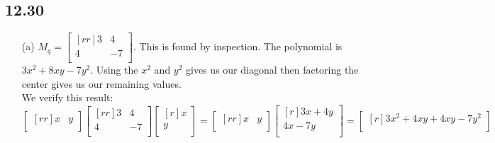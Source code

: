 \documentclass{report}
\theoremstyle{plain}
\theoremstyle{definition}
\theoremstyle{plain}
\begin{document}
\subsection{12.30}
\begin{enumerate}
\item[(a)] $M_q=\begin{bmatrix}[rr]3&4\\4&-7\\\end{bmatrix}$. This is found by inspection. The polynomial is $3x^2+8xy-7y^2$. Using the $x^2$ and $y^2$ gives us our diagonal then factoring the center gives us our remaining values.\\
We verify this result:
\[ \begin{bmatrix}[rr]x&y\\\end{bmatrix}\begin{bmatrix}[rr]3&4\\4&-7\\\end{bmatrix}\begin{bmatrix}[r]x\\y\\\end{bmatrix} = \begin{bmatrix}[rr]x&y\\\end{bmatrix}\begin{bmatrix}[r]3x+4y\\4x-7y\\\end{bmatrix} = \begin{bmatrix}[r]3x^2+4xy+4xy-7y^2\\\end{bmatrix} \]
\end{enumerate}
\end{document}
